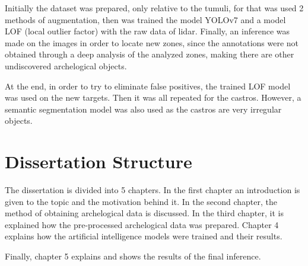 Initially the dataset was prepared, only relative to the tumuli, for that was used 2 methods of augmentation, then was trained the model YOLOv7 and a model LOF (local outlier factor) with the raw data of lidar.
Finally, an inference was made on the images in order to locate new zones, since the annotations were not obtained through a deep analysis of the analyzed zones, making there are other undiscovered archelogical objects.

At the end, in order to try to eliminate false positives, the trained LOF model was used on the new targets.
Then it was all repeated for the castros. However, a semantic segmentation model was also used as the castros are very irregular objects.

\section{Dissertation Structure}
The dissertation is divided into 5 chapters. In the first chapter an introduction is given to the topic and the motivation behind it. In the second chapter, the method of obtaining archelogical data is discussed. In the third chapter, it is explained how the pre-processed archelogical data was prepared. Chapter 4 explains how the artificial intelligence models were trained and their results.

Finally, chapter 5 explains and shows the results of the final inference.